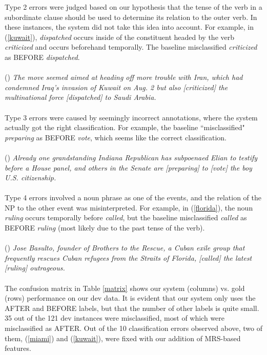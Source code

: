 \documentclass[11pt]{article}
\begin{document}
Type 2 errors were judged based on our hypothesis that the tense of the verb in a subordinate clause should be used to determine its relation to the outer verb. In these instances, the system did not take this idea into account. For example, in (\ref{kuwait}), \emph{dispatched} occurs inside of the constituent headed by the verb \emph{criticized} and occurs beforehand temporally. The baseline misclassified \emph{criticized} as BEFORE \emph{dispatched}.\\\\
(\exampleno) \label{kuwait} \emph{The move seemed aimed at heading off more trouble with Iran, which had condemned Iraq's invasion of Kuwait on Aug. 2 but also [criticized] the multinational force [dispatched] to Saudi Arabia.}\\\\

Type 3 errors were caused by seemingly incorrect annotations, where the system actually got the right classification. For example, the baseline ``misclassified" \emph{preparing} as BEFORE \emph{vote}, which seems like the correct classification.\\\\
(\exampleno) \label{vote} \emph{Already one grandstanding Indiana Republican has subpoenaed Elian to testify before a House panel, and others in the Senate are [preparing] to [vote] the boy U.S. citizenship.}\\\\

Type 4 errors involved a noun phrase as one of the events, and the relation of the NP to the other event was misinterpreted. For example, in (\ref{florida}), the noun \emph{ruling} occurs temporally before \emph{called}, but the baseline misclassified \emph{called} as BEFORE \emph{ruling} (most likely due to the past tense of the verb).\\\\
(\exampleno) \label{florida} \emph{Jose Basulto, founder of Brothers to the Rescue, a Cuban exile group that frequently rescues Cuban refugees from the Straits of Florida, [called] the latest [ruling] outrageous.}\\\\

The confusion matrix in Table \ref{matrix} shows our system (columns) vs. gold (rows) performance on our dev data. It is evident that our system only uses the AFTER and BEFORE labels, but that the number of other labels is quite small. 35 out of the 121 dev instances were misclassified, most of which were misclassified as AFTER. Out of the 10 classification errors observed above, two of them, (\ref{miami}) and (\ref{kuwait}), were fixed with our addition of MRS-based features.
\end{document}
